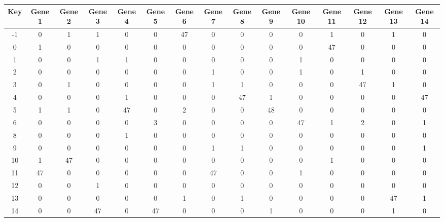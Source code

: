 \begin{tabular}{|c|c|c|c|c|c|c|c|c|c|c|c|c|c|c|}
\hline
Key & Gene 1 & Gene 2 & Gene 3 & Gene 4 & Gene 5 & Gene 6 & Gene 7 & Gene 8 & Gene 9 & Gene 10 & Gene 11 & Gene 12 & Gene 13 & Gene 14 \\
\hline
-1 & 0 & 1 & 1 & 0 & 0 & 47 & 0 & 0 & 0 & 0 & 1 & 0 & 1 & 0 \\
0 & 1 & 0 & 0 & 0 & 0 & 0 & 0 & 0 & 0 & 0 & 47 & 0 & 0 & 0 \\
1 & 0 & 0 & 1 & 1 & 0 & 0 & 0 & 0 & 0 & 1 & 0 & 0 & 0 & 0 \\
2 & 0 & 0 & 0 & 0 & 0 & 0 & 1 & 0 & 0 & 1 & 0 & 1 & 0 & 0 \\
3 & 0 & 1 & 0 & 0 & 0 & 0 & 1 & 1 & 0 & 0 & 0 & 47 & 1 & 0 \\
4 & 0 & 0 & 0 & 1 & 0 & 0 & 0 & 47 & 1 & 0 & 0 & 0 & 0 & 47 \\
5 & 1 & 1 & 0 & 47 & 0 & 2 & 0 & 0 & 48 & 0 & 0 & 0 & 0 & 0 \\
6 & 0 & 0 & 0 & 0 & 3 & 0 & 0 & 0 & 0 & 47 & 1 & 2 & 0 & 1 \\
8 & 0 & 0 & 0 & 1 & 0 & 0 & 0 & 0 & 0 & 0 & 0 & 0 & 0 & 0 \\
9 & 0 & 0 & 0 & 0 & 0 & 0 & 1 & 1 & 0 & 0 & 0 & 0 & 0 & 1 \\
10 & 1 & 47 & 0 & 0 & 0 & 0 & 0 & 0 & 0 & 0 & 1 & 0 & 0 & 0 \\
11 & 47 & 0 & 0 & 0 & 0 & 0 & 47 & 0 & 0 & 1 & 0 & 0 & 0 & 0 \\
12 & 0 & 0 & 1 & 0 & 0 & 0 & 0 & 0 & 0 & 0 & 0 & 0 & 0 & 0 \\
13 & 0 & 0 & 0 & 0 & 0 & 1 & 0 & 1 & 0 & 0 & 0 & 0 & 47 & 1 \\
14 & 0 & 0 & 47 & 0 & 47 & 0 & 0 & 0 & 1 & 0 & 0 & 0 & 1 & 0 \\
\hline
\end{tabular}